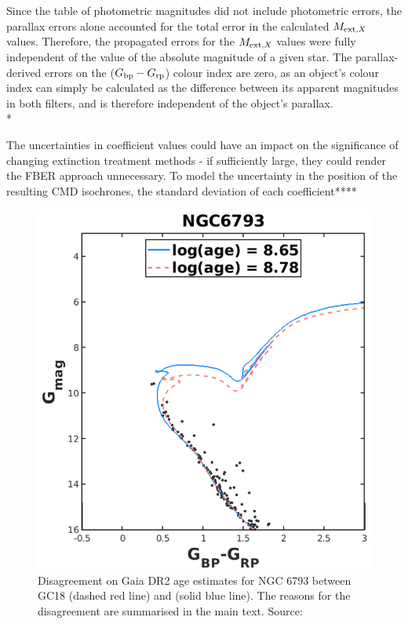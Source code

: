 \documentclass[12pt, a4paper]{report}
\begin{document}
Since the table of photometric magnitudes did not include photometric errors, the parallax errors alone accounted for the total error in the calculated $M_{\textnormal{ext},X}$ values. Therefore, the propagated errors for the $M_{\textnormal{ext},X}$ values were fully independent of the value of the absolute magnitude of a given star. The parallax-derived errors on the ($G_{\textnormal{bp}}-G_{\textnormal{rp}}$) colour index are zero, as an object's colour index can simply be calculated as the difference between its apparent magnitudes in both filters, and is therefore independent of the object's parallax.\\*

The uncertainties in coefficient values could have an impact on the significance of changing extinction treatment methods - if sufficiently large, they could render the FBER approach unnecessary. To model the uncertainty in the position of the resulting CMD isochrones, the standard deviation of each coefficient****

\begin{figure}[h!]
\begin{center}
\includegraphics[width=1.0\textwidth]{bossini_ngc6793_different_age_estimate.png}
\caption{Disagreement on Gaia DR2 age estimates for NGC 6793 between GC18 (dashed red line) and \cite{2019A&A...623A.108B} (solid blue line). The reasons for the disagreement are summarised in the main text. Source:\cite{2019A&A...623A.108B}}
\label{bossini_age_cmd}
\end{center}
\end{figure}
\end{document}

